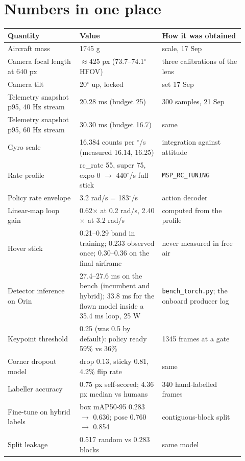 \documentclass{article}
\begin{document}
\section{Numbers in one place}
\begin{table}[htbp]\centering\small
\begin{tabular}{@{}p{0.28\linewidth}p{0.32\linewidth}p{0.32\linewidth}@{}}
\toprule
Quantity & Value & How it was obtained \\ \midrule
Aircraft mass & 1745 g & scale, 17 Sep \\
Camera focal length at 640 px & $\approx$425 px (73.7--74.1$^\circ$ HFOV) & three calibrations of the lens \\
Camera tilt & 20$^\circ$ up, locked & set 17 Sep \\
Telemetry snapshot p95, 40 Hz stream & 20.28 ms (budget 25) & 300 samples, 21 Sep \\
Telemetry snapshot p95, 60 Hz stream & 30.30 ms (budget 16.7) & same \\
Gyro scale & 16.384 counts per $^\circ$/s (measured 16.14, 16.25) & integration against attitude \\
Rate profile & rc\_rate 55, super 75, expo 0 $\rightarrow$ 440$^\circ$/s full stick & \texttt{MSP\_RC\_TUNING} \\
Policy rate envelope & 3.2 rad/s = 183$^\circ$/s & action decoder \\
Linear-map loop gain & 0.62$\times$ at 0.2 rad/s, 2.40$\times$ at 3.2 rad/s & computed from the profile \\
Hover stick & 0.21--0.29 band in training; 0.233 observed once; 0.30--0.36 on the final airframe & never measured in free air \\
Detector inference on Orin & 27.4--27.6 ms on the bench (incumbent and hybrid); 33.8 ms for the flown model inside a 35.4 ms loop, 25 W & \texttt{bench\_torch.py}; the onboard producer log \\
Keypoint threshold & 0.25 (was 0.5 by default): policy ready 59\% vs 36\% & 1345 frames at a gate \\
Corner dropout model & drop 0.13, sticky 0.81, 4.2\% flip rate & same \\
Labeller accuracy & 0.75 px self-scored; 4.36 px median vs humans & 340 hand-labelled frames \\
Fine-tune on hybrid labels & box mAP50-95 0.283 $\rightarrow$ 0.636; pose 0.760 $\rightarrow$ 0.854 & contiguous-block split \\
Split leakage & 0.517 random vs 0.283 blocks & same model \\

\end{tabular}
\end{table}
\end{document}
